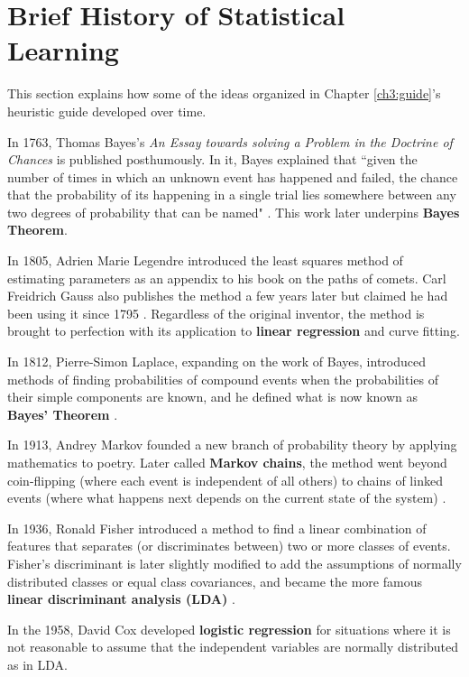 \chapter{Brief History of Statistical Learning} \label{c:history}
This section explains how some of the ideas organized in Chapter \ref{ch3:guide}'s heuristic guide developed over time. 

In 1763, Thomas Bayes's \textit{An Essay towards solving a Problem in the Doctrine of Chances} is published posthumously. In it, Bayes explained that ``given the number of times in which an unknown event has happened and failed, the chance that the probability of its happening in a single trial lies somewhere between any two degrees of probability that can be named" \cite{mr1763essay}. This work later underpins \textbf{Bayes Theorem}.  

In 1805, Adrien Marie Legendre introduced the least squares method of estimating parameters as an appendix to his book on the paths of comets. Carl Freidrich Gauss also publishes the method a few years later but claimed he had been using it since 1795 \cite{stigler1981gauss}. Regardless of the original inventor, the method is brought to perfection with its application to \textbf{linear regression} and curve fitting. 

In 1812, Pierre-Simon Laplace, expanding on the work of Bayes, introduced methods of finding probabilities of compound events when the probabilities of their simple components are known, and he defined what is now known as \textbf{Bayes' Theorem} \cite{o2000biography}.

In 1913, Andrey Markov founded a new branch of probability theory by applying mathematics to poetry. Later called \textbf{Markov chains}, the method went beyond coin-flipping (where each event is independent of all others) to chains of linked events (where what happens next depends on the current state of the system) \cite{hayes2013first}. 

In 1936, Ronald Fisher introduced a method to find a linear combination of features that separates (or discriminates between) two or more classes of events. Fisher's discriminant is later slightly modified to add the assumptions of normally distributed classes or equal class covariances, and became the more famous \textbf{linear discriminant analysis (LDA)} \cite{hardle2007applied}. 

In the 1958, David Cox developed \textbf{logistic regression} for situations where it is not reasonable to assume that the independent variables are normally distributed as in LDA. 

